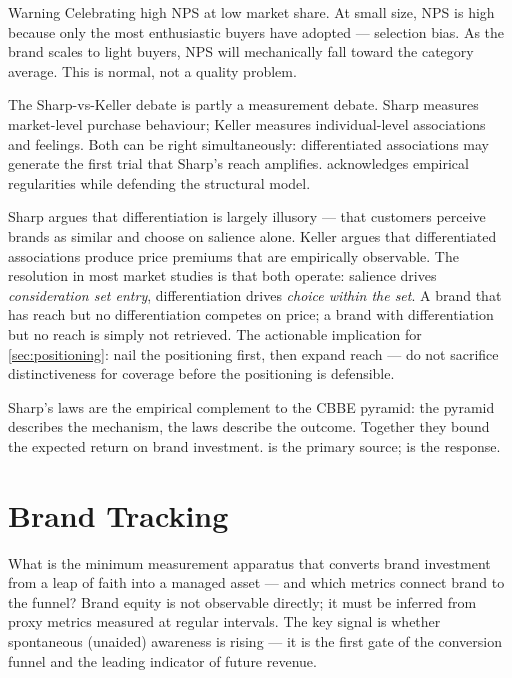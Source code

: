 \begin{admonition}{Warning}
Celebrating high NPS at low market share. At small size, NPS is high because only the most enthusiastic buyers have adopted --- selection bias. As the brand scales to light buyers, NPS will mechanically fall toward the category average. This is normal, not a quality problem.
\end{admonition}

The Sharp-vs-Keller debate is partly a measurement debate. Sharp measures market-level purchase behaviour; Keller measures individual-level associations and feelings. Both can be right simultaneously: differentiated associations may generate the first trial that Sharp's reach amplifies. \textcite{keller2019} acknowledges empirical regularities while defending the structural model.

Sharp argues that differentiation is largely illusory --- that customers perceive brands as similar and choose on salience alone. Keller argues that differentiated associations produce price premiums that are empirically observable. The resolution in most market studies is that both operate: salience drives \emph{consideration set entry}, differentiation drives \emph{choice within the set}. A brand that has reach but no differentiation competes on price; a brand with differentiation but no reach is simply not retrieved. The actionable implication for \cref{sec:positioning}: nail the positioning first, then expand reach --- do not sacrifice distinctiveness for coverage before the positioning is defensible.

Sharp's laws are the empirical complement to the CBBE pyramid: the pyramid describes the mechanism, the laws describe the outcome. Together they bound the expected return on brand investment. \textcite{sharp2010} is the primary source; \textcite{keller2019} is the response.

\section{Brand Tracking}\label{sec:brand-tracking}

What is the minimum measurement apparatus that converts brand investment from a leap of faith into a managed asset --- and which metrics connect brand to the funnel? Brand equity is not observable directly; it must be inferred from proxy metrics measured at regular intervals. The key signal is whether spontaneous (unaided) awareness is rising --- it is the first gate of the conversion funnel and the leading indicator of future revenue.

